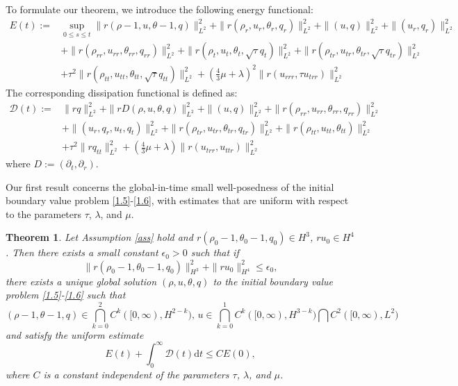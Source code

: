 \documentclass[11pt,reqno]{amsart}
\numberwithin{equation}{section}
\newtheorem{theorem}{Theorem}[section]
\newcommand{\dif}{\mathrm{d}}
\begin{document}
To formulate our theorem, we introduce the following energy functional:
\begin{align*}
E(t) := & \sup_{0 \le s \le t} \|r(\rho - 1, u, \theta - 1, q)\|_{L^2}^2 + \|r(\rho_r, u_r, \theta_r, q_r)\|_{L^2}^2 + \|(u, q)\|_{L^2}^2+ \|(u_r, q_r)\|_{L^2}^2   \\
& + \|r(\rho_{rr}, u_{rr}, \theta_{rr}, q_{rr})\|_{L^2}^2  + \|r(\rho_t, u_t, \theta_t, \sqrt{\tau} q_t)\|_{L^2}^2  + \|r(\rho_{tr}, u_{tr}, \theta_{tr}, \sqrt{\tau} q_{tr})\|_{L^2}^2 \\
&+ \tau^2 \|r(\rho_{tt}, u_{tt}, \theta_{tt}, \sqrt{\tau} q_{tt})\|_{L^2}^2+ \left(\frac{4}{3}\mu+\lambda\right)^2 \|r(u_{rrr}, \tau u_{trr})\|_{L^2}^2
\end{align*} The corresponding dissipation functional is defined as:
\begin{align*}
\mathcal{D}(t) := & \|r q\|_{L^2}^2 + \|r D(\rho, u, \theta, q)\|_{L^2}^2 + \|(u, q)\|_{L^2}^2 + \|r(\rho_{rr}, u_{rr}, \theta_{rr}, q_{rr})\|_{L^2}^2  \\
& + \|(u_r, q_r, u_t, q_t)\|_{L^2}^2 + \|r(\rho_{tr}, u_{tr}, \theta_{tr}, q_{tr})\|_{L^2}^2 + \|r(\rho_{tt}, u_{tt}, \theta_{tt})\|_{L^2}^2   \\
& + \tau^2 \|r q_{tt}\|_{L^2}^2+\left( \frac{4}{3} \mu+\lambda \right)\| r (u_{trr}, u_{ttr})\|_{L^2}^2
\end{align*}
where \( D := (\partial_t, \partial_r) \).

Our first result concerns the global-in-time small well-posedness of the initial boundary value problem \eqref{1.5}-\eqref{1.6}, with estimates that are uniform with respect to the parameters \(\tau\), \(\lambda\), and \(\mu\).
\begin{theorem}\label{th1.1}
Let Assumption \ref{ass} hold and $r(\rho_0-1, \theta_0-1, q_0)\in H^{{3}}$,  $ru_0\in H^4$. Then there exists a small constant \(\epsilon_0 > 0\) such that if
\[
\|r(\rho_0-1, \theta_0-1, q_0)\|_{H^{3}}^2+\|ru_0\|_{H^4}^2  \le \epsilon_0,
\]
there exists a unique global solution \((\rho, u, \theta, q)\) to the initial boundary value problem \eqref{1.5}-\eqref{1.6} such that
\[
(\rho-1, \theta-1, q)\in \bigcap\limits_{k=0}^2 C^k([0,\infty), H^{2-k}),\, u\in \bigcap\limits_{k=0}^1 C^k([0,\infty), H^{3-k}) \bigcap C^2([0,\infty), L^2)
\]
and satisfy the uniform estimate
\[
E(t)+\int_0^\infty \mathcal D(t) \dif t \le C E(0),
\]
where \(C\) is a constant independent of the parameters \(\tau\), \(\lambda\), and \(\mu\).
\end{theorem}
\end{document}
